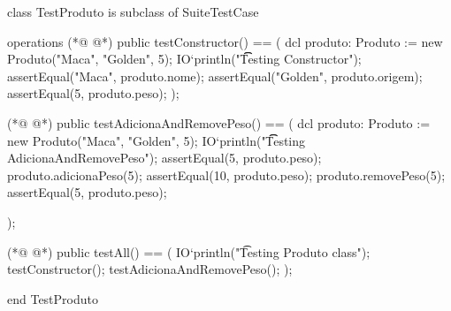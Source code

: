 \begin{vdmpp}[breaklines=true]
class TestProduto is subclass of SuiteTestCase

operations
(*@
\label{testConstructor:4}
@*)
  public testConstructor() == (
   dcl produto: Produto := new Produto("Maca", "Golden", 5);
    IO`println("\t\t Testing Constructor");
    assertEqual("Maca", produto.nome);
    assertEqual("Golden", produto.origem);
    assertEqual(5, produto.peso);
  );
  
(*@
\label{testAdicionaAndRemovePeso:12}
@*)
  public testAdicionaAndRemovePeso() == (
   dcl produto: Produto := new Produto("Maca", "Golden", 5);
  IO`println("\t\t Testing AdicionaAndRemovePeso");
  assertEqual(5, produto.peso);
  produto.adicionaPeso(5);
  assertEqual(10, produto.peso);
  produto.removePeso(5);
  assertEqual(5, produto.peso);
  
  );

(*@
\label{testAll:23}
@*)
  public testAll() == (
    IO`println("\t Testing Produto class");
    testConstructor();
    testAdicionaAndRemovePeso();
  );

end TestProduto
\end{vdmpp}
